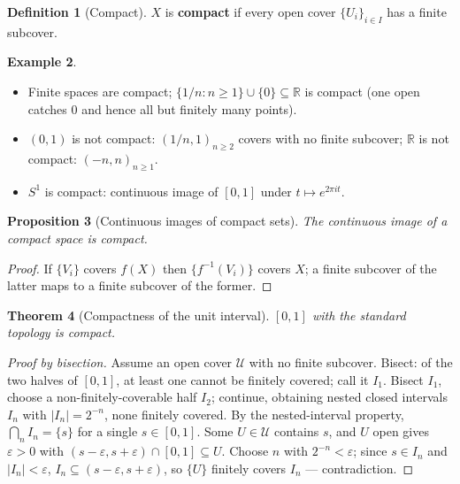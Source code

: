 \documentclass[11pt,a4paper]{article}
\newtheorem{theorem}{Theorem}[section]
\newtheorem{proposition}[theorem]{Proposition}
\theoremstyle{definition}
\newtheorem{definition}[theorem]{Definition}
\newtheorem{example}[theorem]{Example}
\newcommand{\R}{\mathbb{R}}
\begin{document}
	\begin{definition}[Compact]
		$X$ is \textbf{compact} if every open cover $\{U_i\}_{i\in I}$ has a finite subcover.
	\end{definition}
	
	\begin{example}\label{ex:compact}
		\begin{itemize}
			\item Finite spaces are compact; $\{1/n:n\ge1\}\cup\{0\}\subseteq\R$ is compact (one open catches $0$ and hence all but finitely many points).
			\item $(0,1)$ is not compact: $(1/n,1)_{n\ge2}$ covers with no finite subcover; $\R$ is not compact: $(-n,n)_{n\ge1}$.
			\item $S^1$ is compact: continuous image of $[0,1]$ under $t\mapsto e^{2\pi it}$.
		\end{itemize}
	\end{example}
	
	\begin{proposition}[Continuous images of compact sets]\label{prop:compact-image}
		The continuous image of a compact space is compact.
	\end{proposition}
	\begin{proof}
		If $\{V_i\}$ covers $f(X)$ then $\{f^{-1}(V_i)\}$ covers $X$; a finite subcover of the latter maps to a finite subcover of the former.
	\end{proof}
	
	\begin{theorem}[Compactness of the unit interval]\label{thm:unit-interval}
		$[0,1]$ with the standard topology is compact.
	\end{theorem}
	\begin{proof}[Proof by bisection]
		Assume an open cover $\mathcal U$ with no finite subcover. Bisect: of the two halves of $[0,1]$, at
		least one cannot be finitely covered; call it $I_1$. Bisect $I_1$, choose a non-finitely-coverable half
		$I_2$; continue, obtaining nested closed intervals $I_n$ with $|I_n|=2^{-n}$, none finitely covered. By
		the nested-interval property, $\bigcap_n I_n=\{s\}$ for a single $s\in[0,1]$. Some $U\in\mathcal U$
		contains $s$, and $U$ open gives $\varepsilon>0$ with $(s-\varepsilon,s+\varepsilon)\cap[0,1]\subseteq U$.
		Choose $n$ with $2^{-n}<\varepsilon$; since $s\in I_n$ and $|I_n|<\varepsilon$, $I_n\subseteq(s-\varepsilon,s+\varepsilon)$,
		so $\{U\}$ finitely covers $I_n$ --- contradiction.
	\end{proof}
	
\end{document}
